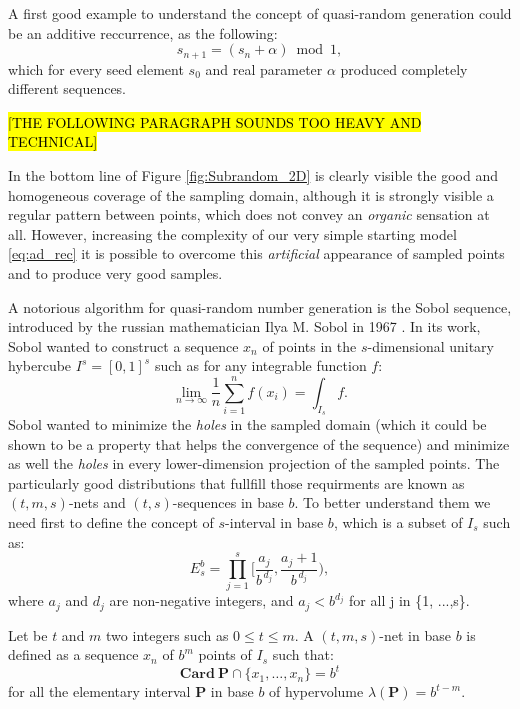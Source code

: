 A first good example to understand the concept of quasi-random generation could be an additive reccurrence, as the following:
\begin{equation}
    s_{n+1} = ( s_n + \alpha ) \bmod 1,
    \label{eq:ad_rec}
\end{equation}
which for every seed element $s_0$ and real parameter $\alpha$ produced completely different sequences.

\hl{[THE FOLLOWING PARAGRAPH SOUNDS TOO HEAVY AND TECHNICAL]}

In the bottom line of Figure \ref{fig:Subrandom_2D} is clearly visible the good and homogeneous coverage of the sampling domain, although it is strongly visible a regular pattern between points, which does not convey an \textit{organic} sensation at all. However, increasing the complexity of our very simple starting model \ref{eq:ad_rec} it is possible to overcome this \textit{artificial} appearance of sampled points and to produce very good samples.

A notorious algorithm for quasi-random number generation is the Sobol sequence, introduced by the russian mathematician Ilya M. Sobol in 1967 \cite{SOBOL2001271}. In its work, Sobol wanted to construct a sequence $x_n$ of points in the $s$-dimensional unitary hybercube $I^s = [0,1]^s$ such as for any integrable function $f$:
\begin{equation}
    \lim_{n\to\infty} \frac{1}{n} \sum_{i=1}^{n} f(x_i) = \int_{I_s} f.
\end{equation}
Sobol wanted to minimize the \textit{holes} in the sampled domain (which it could be shown to be a property that helps the convergence of the sequence) and minimize as well the \textit{holes} in every lower-dimension projection of the sampled points. The particularly good distributions that fullfill those requirments are known as $(t,m,s)$-nets and $(t,s)$-sequences in base $b$. To better understand them we need first to define the concept of $s$-interval in base $b$, which is a subset of $I_s$ such as:
\begin{equation}
    E_s^b = \prod_{j=1}^{s} \Bigg[ \frac{a_j}{b^{\,d_j}}, \frac{a_j + 1}{b^{\,d_j}}\Bigg),
\end{equation}
where $a_j$ and $d_j$ are non-negative integers, and $a_j < b^{d_j}$ for all j in \{1, ...,s\}.

Let be $t$ and $m$ two integers such as $0 \leq t \leq m$. A $(t,m,s)$-net in base $b$ is defined as a sequence $x_n$ of $b^m$ points of $I_s$ such that:
\begin{equation}
    \mathbf{Card} \ \mathbf{P} \cap \{x_1, \dots, x_n \} = b^t
\end{equation}
for all the elementary  interval $\mathbf{P}$ in base $b$ of hypervolume $\lambda(\mathbf{P}) =  b^{t-m}$.

